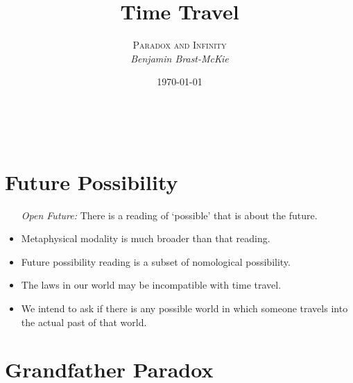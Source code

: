 \documentclass[a4paper, 11pt]{article} %
\title{\textbf{Time Travel}} %
\author{\textsc{Paradox and Infinity}\\ \em Benjamin Brast-McKie} %
\date{\today} %
\makeatletter
\renewcommand{\maketitle}{ %
\begin{flushright} %
{\LARGE\@title} %

\vspace{10pt} %

{\@author} %
\\\@date %

\vspace{-20pt} %
\end{flushright}
}
\makeatother
\begin{document}
\maketitle %

\thispagestyle{empty}


\section*{Future Possibility}

\begin{itemize}
  \item[\it Open Future:] There is a reading of `possible' that is about the future.
    \item Metaphysical modality is much broader than that reading.
    \item Future possibility reading is a subset of nomological possibility. 
    \item The laws in our world may be incompatible with time travel.
    \item We intend to ask if there is any possible world in which someone travels into the actual past of that world.
\end{itemize}




\section*{Grandfather Paradox}
\end{document}

